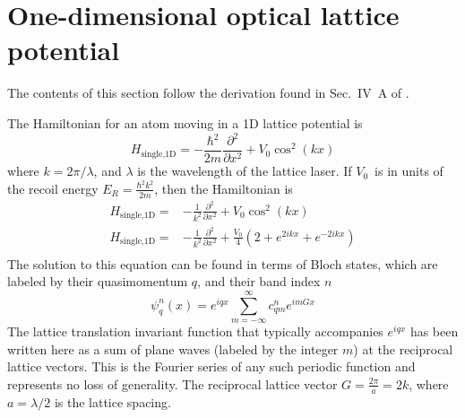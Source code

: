 \documentclass[11pt,letter]{article}
\newcommand{\vo}{\ensuremath{V_{0}}}
\newcommand{\er}{\ensuremath{E_{R}}}
\begin{document}
\section{One-dimensional optical lattice potential}

The contents of this section follow the derivation found in Sec.~IV~A of \cite{RevModPhys.78.179}.

The Hamiltonian for an atom moving in a 1D lattice potential is 
\begin{equation}
  H_{\text{single,1D}} = - \frac{\hbar^{2}}{2m} \frac{\partial^{2}}{\partial x^{2}} + \vo\cos^{2}(kx) 
\end{equation}
where $k=2\pi/\lambda$, and $\lambda$ is the wavelength of the lattice laser. 
If \vo\ is in units of the recoil energy $\er=\frac{\hbar^{2}k^{2}}{2m}$, then the Hamiltonian is 
\begin{equation}
\begin{split}
  H_{\text{single,1D}}= &-\frac{1}{k^{2}} \frac{\partial^{2}}{\partial x^{2}} + \vo\cos^{2}(kx) \\
  H_{\text{single,1D}} = &-\frac{1}{k^{2}} \frac{\partial^{2}}{\partial x^{2}} + \frac{\vo}{4}(2+e^{2ikx} + e^{-2ikx} )  \\
\end{split}
\end{equation}
The solution to this equation can be found in terms of Bloch states, which are labeled by their quasimomentum $q$, and their band index $n$
\begin{equation}
  \psi_{q}^{n}(x) = e^{iqx} \sum_{m=-\infty}^{\infty} c_{qm}^{n} e^{imGx}
  \label{eq:blochstate}
\end{equation}
The lattice translation invariant function that typically accompanies $e^{iqx}$
has been written here as a sum of plane waves (labeled by the integer $m$) at the reciprocal lattice
vectors.  This is the Fourier series of any such periodic function and represents no loss of
generality.   The reciprocal lattice vector  $G=\frac{2\pi}{a}=2k$,
where $a=\lambda/2$ is the lattice spacing.  
\end{document}
